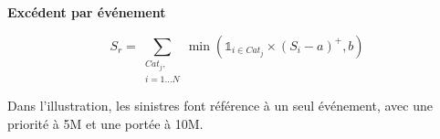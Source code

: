 \begin{f}
\textbf{Excédent par événement}
	
	$$
	S_r= \sum_{\begin{array}{c}
			Cat_j,\\ i=1\ldots N
	\end{array}} \min\left( \mathds{1}_{i\in Cat_j}\times \left( S_i-a\right)^+,b\right)  
	$$
	
	Dans l'illustration, les sinistres font référence à un seul événement, avec une priorité à 5M\EUR{}  et une portée à 10M\EUR{}.
	


\end{f}
